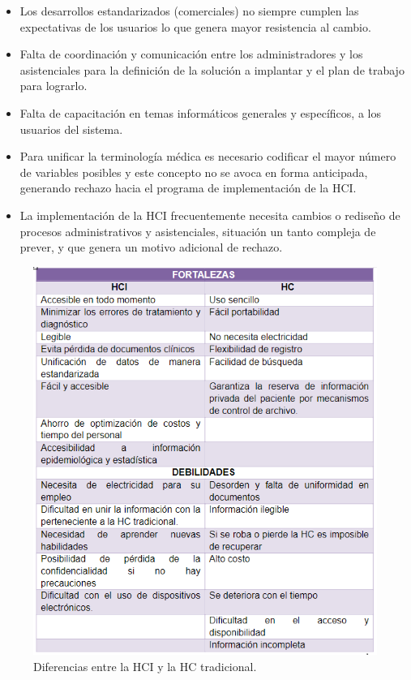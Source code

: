 \begin{itemize}
\item	Los desarrollos estandarizados (comerciales) no siempre cumplen las expectativas de los usuarios lo que genera mayor resistencia al cambio.  
	
	\item Falta de coordinación y comunicación entre los administradores y los asistenciales para la definición de la solución a implantar y el plan de trabajo para lograrlo.  
	
	\item Falta de capacitación en temas informáticos generales y específicos, a los usuarios del sistema. 
	
	\item Para unificar la terminología médica es necesario codificar el mayor número de variables posibles y este concepto no se avoca en forma anticipada, generando rechazo hacia el programa de implementación de la HCI. 
	
	\item La implementación de la HCI frecuentemente necesita cambios o rediseño de procesos administrativos y asistenciales, situación un tanto compleja de prever, y que genera un motivo adicional de rechazo.  
\end{itemize}
\begin{center}
	\begin{figure}
		\caption{Diferencias entre la HCI y la HC tradicional. }
		\label{HCIvsHC}
		\includegraphics[]{MainMatter/HCIvsHC.PNG}
		
		
	\end{figure}
	
\end{center}

